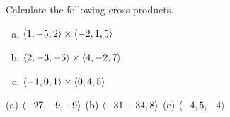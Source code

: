 \begin{question}
Calculate the following cross products.
\begin{enumerate}[(a)]
\item $\left< 1,-5,2\right> \times\left< -2,1,5\right> $
\item $\left< 2,-3,-5\right> \times\left< 4,-2,7\right> $
\item $\left< -1,0,1\right> \times\left< 0,4,5\right> $
\end{enumerate}
\end{question}


\begin{answer}
(a) $\left< -27,-9,-9\right>$ \qquad
(b) $\left< -31,-34,8\right>$ \qquad
(c) $\left< -4,5,-4\right>$
\end{answer}

